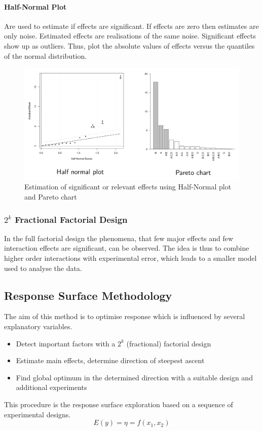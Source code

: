\documentclass[11pt]{article}
\theoremstyle{definition}
\begin{document}
\paragraph{Half-Normal Plot} Are used to estimate if effects are significant. If effects are zero then estimates are only noise. Estimated effects are realisations of the same noise. Significant effects show up as outliers. Thus, plot the absolute values of effects versus the quantiles of the normal distribution.
\begin{figure}[H]
	\centering
	\includegraphics[width=0.8\linewidth]{img/significant_relevant_effects_factorial_design}
	\caption{Estimation of significant or relevant effects using Half-Normal plot and Pareto chart}
	\label{fig:significantrelevanteffectsfactorialdesign}
\end{figure}

\subsubsection{$2^k$ Fractional Factorial Design}
In the full factorial design the phenomena, that few major effects and few interaction effects are significant, can be observed. The idea is thus to combine higher order interactions with experimental error, which leads to a smaller model used to analyse the data.

\subsection{Response Surface Methodology}
The aim of this method is to optimise response which is influenced by several explanatory variables.
\begin{itemize}
	\item Detect important factors with a $2^k$ (fractional) factorial design
	\item Estimate main effects, determine direction of steepest ascent
	\item Find global optimum in the determined direction with a suitable design and additional experiments
\end{itemize}
This procedure is the response surface exploration based on a sequence of experimental designs.
\begin{equation*}
	E(y) = \eta = f(x_1, x_2)
\end{equation*}
\end{document}
